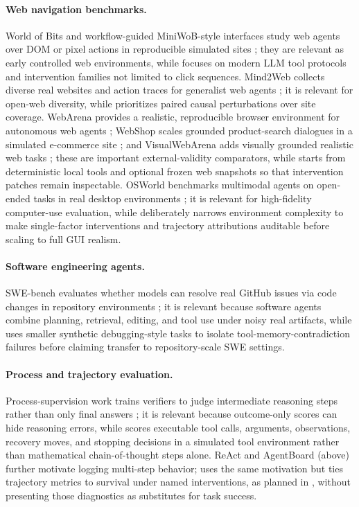 \paragraph{Web navigation benchmarks.}
World of Bits and workflow-guided MiniWoB-style interfaces study web agents over DOM or pixel actions in reproducible simulated sites \citep{shi2017worldofbits,liu2018reinforcementwebinterfaces}; they are relevant as early controlled web environments, while \CAB{} focuses on modern LLM tool protocols and intervention families not limited to click sequences.
Mind2Web collects diverse real websites and action traces for generalist web agents \citep{deng2023mind2webgeneralistagentweb}; it is relevant for open-web diversity, while \CAB{} prioritizes paired causal perturbations over site coverage.
WebArena provides a realistic, reproducible browser environment for autonomous web agents \citep{zhou2024webarenarealisticwebenvironment}; WebShop scales grounded product-search dialogues in a simulated e-commerce site \citep{yao2022webshoptowardsscalablereal}; and VisualWebArena adds visually grounded realistic web tasks \citep{koh2024visualwebarenaevaluatingmultimodal}; these are important external-validity comparators, while \CAB{} starts from deterministic local tools and optional frozen web snapshots so that intervention patches remain inspectable.
OSWorld benchmarks multimodal agents on open-ended tasks in real desktop environments \citep{xie2024osworldbenchmarkingmultimodalagents}; it is relevant for high-fidelity computer-use evaluation, while \CAB{} deliberately narrows environment complexity to make single-factor interventions and trajectory attributions auditable before scaling to full GUI realism.

\paragraph{Software engineering agents.}
SWE-bench evaluates whether models can resolve real GitHub issues via code changes in repository environments \citep{jimenez2024swebenchlanguagemodelsresolve}; it is relevant because software agents combine planning, retrieval, editing, and tool use under noisy real artifacts, while \CAB{} uses smaller synthetic debugging-style tasks to isolate tool-memory-contradiction failures before claiming transfer to repository-scale SWE settings.

\paragraph{Process and trajectory evaluation.}
Process-supervision work trains verifiers to judge intermediate reasoning steps rather than only final answers \citep{lightman2023letsverifystepstep}; it is relevant because outcome-only scores can hide reasoning errors, while \CAB{} scores executable tool calls, arguments, observations, recovery moves, and stopping decisions in a simulated tool environment rather than mathematical chain-of-thought steps alone.
ReAct and AgentBoard (above) further motivate logging multi-step behavior; \CAB{} uses the same motivation but ties trajectory metrics to survival under named interventions, as planned in , without presenting those diagnostics as substitutes for task success.

